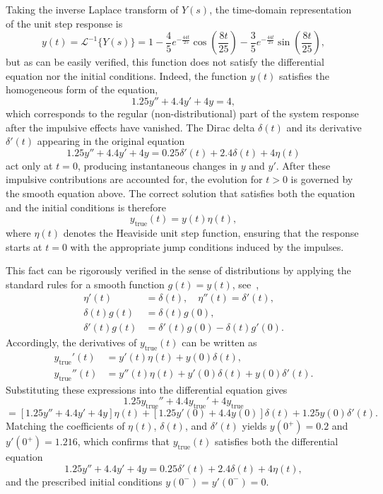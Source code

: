 \documentclass[preprint,12pt]{elsarticle}
\begin{document}
\begin{rem}
Taking the inverse Laplace transform of \( Y(s) \), the time-domain representation of the unit step response is
\[
y(t) = \mathcal{L}^{-1}\{Y(s)\} 
= 1 - \frac{4}{5} e^{-\frac{44t}{25}} \cos\!\left(\frac{8t}{25}\right) 
- \frac{3}{5} e^{-\frac{44t}{25}} \sin\!\left(\frac{8t}{25}\right),
\]
but as can be easily verified, this function does not satisfy the differential equation nor the initial conditions.  
Indeed, the function \( y(t) \) satisfies the homogeneous form of the equation,
\[
1.25y'' + 4.4y' + 4y = 4,
\]
which corresponds to the regular (non-distributional) part of the system response after the impulsive effects have vanished.  
The Dirac delta \( \delta(t) \) and its derivative \( \delta'(t) \) appearing in the original equation 
\[
1.25y'' + 4.4y' + 4y = 0.25\delta'(t) + 2.4\delta(t) + 4\eta(t)
\]
act only at \( t = 0 \), producing instantaneous changes in \( y \) and \( y' \).  
After these impulsive contributions are accounted for, the evolution for \( t > 0 \) is governed by the smooth equation above.  
The correct solution that satisfies both the equation and the initial conditions is therefore 
\[
y_{\text{true}}(t) = y(t)\eta(t),
\]
where \( \eta(t) \) denotes the Heaviside unit step function, ensuring that the response starts at \( t = 0 \) with the appropriate jump conditions induced by the impulses.

This fact can be rigorously verified in the sense of distributions by applying the standard rules for a smooth function \( g(t) = y(t) \), see~\cite{Lundberg2007},
\[
\begin{aligned}
	\eta'(t) &= \delta(t), \quad \eta''(t) = \delta'(t), \\
	\delta(t)g(t) &= \delta(t)g(0), \\
	\delta'(t)g(t) &= \delta'(t)g(0) - \delta(t)g'(0).
\end{aligned}
\]
Accordingly, the derivatives of \( y_{\text{true}}(t) \) can be written as
\[
\begin{aligned}
	y_{\text{true}}'(t) &= y'(t)\eta(t) + y(0)\delta(t), \\
	y_{\text{true}}''(t) &= y''(t)\eta(t) + y'(0)\delta(t) + y(0)\delta'(t).
\end{aligned}
\] 
Substituting these expressions into the differential equation gives
\[
1.25y_{\text{true}}'' + 4.4y_{\text{true}}' + 4y_{\text{true}}
\]
\[
= [1.25y'' + 4.4y' + 4y]\eta(t) 
+ [1.25y'(0) + 4.4y(0)]\delta(t) + 1.25y(0)\delta'(t).
\]
Matching the coefficients of \( \eta(t) \), \( \delta(t) \), and \( \delta'(t) \) yields 
\( y(0^+) = 0.2 \) and \( y'(0^+) = 1.216 \), 
which confirms that \( y_{\text{true}}(t) \) satisfies both the differential equation 
\[
1.25y'' + 4.4y' + 4y = 0.25\delta'(t) + 2.4\delta(t) + 4\eta(t),
\]
and the prescribed initial conditions \( y(0^-)=y'(0^-)=0 \). 
\end{rem}
\end{document}
